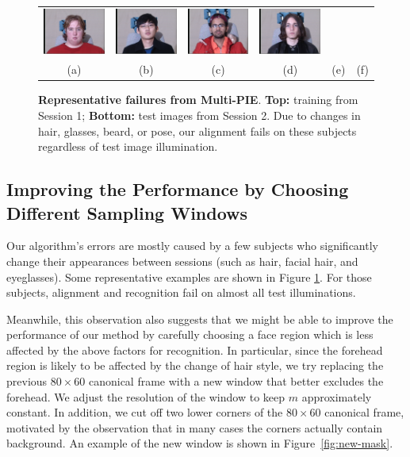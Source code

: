 \documentclass[12pt,journal,draftcls,letterpaper,onecolumn]{IEEEtran}
\begin{document}
\begin{figure}
{\begin{tabular}{cccccc}
\includegraphics[width=0.9in,clip=true]{figures_pami/multipie_failed/196_02_01_051_08.png}  &
\includegraphics[width=0.9in,clip=true]{figures_pami/multipie_failed/130_02_01_051_08.png}  &
\includegraphics[width=0.9in,clip=true]{figures_pami/multipie_failed/163_02_01_051_08.png}  &
\includegraphics[width=0.9in,clip=true]{figures_pami/multipie_failed/175_02_01_051_08.png} \vspace{-.1in} \\
(a) & (b) & (c) & (d) & (e) & (f) \vspace{-.1in}
\end{tabular}
}
\caption{{\bf Representative failures from Multi-PIE}. {\bf Top:} training from Session 1; {\bf Bottom:} test images from Session 2. Due to changes in hair, glasses, beard, or pose, our alignment fails on these subjects regardless of test image illumination.}
\label{fig:failed-examples}
\vspace{-.3in}
\end{figure}

\subsection{Improving the Performance by Choosing Different Sampling Windows}
Our algorithm's errors are mostly caused by a few subjects who
significantly change their appearances between sessions (such
as hair, facial hair, and eyeglasses). Some representative
examples are shown in Figure \ref{fig:failed-examples}. For those subjects, alignment and recognition fail on
almost all test illuminations.

Meanwhile, this observation also suggests that we might be able
to improve the performance of our method by carefully choosing
a face region which is less affected by the above factors for
recognition. In particular, since the forehead region is likely
to be affected by the change of hair style, we try replacing
the previous $80 \times 60$ canonical frame with a new
window that better excludes the forehead. We adjust the
resolution of the window to keep $m$ approximately constant. In addition,
we cut off two lower corners of the $80 \times 60$ canonical frame, motivated by
the observation that in many cases the corners
actually contain background. An example of the new window
is shown in Figure~\ref{fig:new-mask}.
\end{document}

